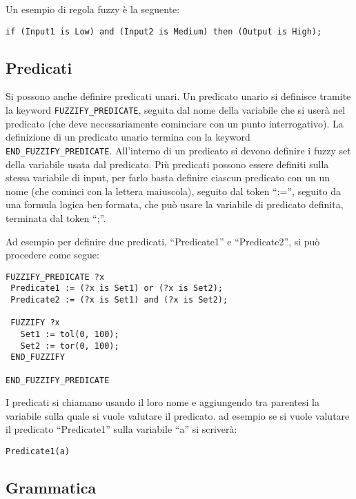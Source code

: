 Un esempio di regola fuzzy è la seguente:

\begin{verbatim}
if (Input1 is Low) and (Input2 is Medium) then (Output is High); 
\end{verbatim}



\subsection{Predicati}
Si possono anche definire predicati unari. Un predicato unario si definisce tramite la keyword \verb|FUZZIFY_PREDICATE|, seguita dal nome della variabile che si userà nel predicato (che deve necessariamente cominciare con un punto interrogativo). La definizione di un predicato unario termina con la keyword \verb|END_FUZZIFY_PREDICATE|. All'interno di un predicato si devono definire i fuzzy set della variabile usata dal predicato. Più predicati possono essere definiti sulla stessa variabile di input, per farlo basta definire ciascun predicato con un un nome (che cominci con la lettera maiuscola), seguito dal token ``:='', seguito da una formula logica ben formata, che può usare la variabile di predicato definita, terminata dal token ``;''.

Ad esempio per definire due predicati, ``Predicate1'' e ``Predicate2'', si può procedere come segue:
\begin{verbatim}
FUZZIFY_PREDICATE ?x
 Predicate1 := (?x is Set1) or (?x is Set2);
 Predicate2 := (?x is Set1) and (?x is Set2);
 
 FUZZIFY ?x
   Set1 := tol(0, 100);
   Set2 := tor(0, 100);
 END_FUZZIFY

END_FUZZIFY_PREDICATE
\end{verbatim}

I predicati si chiamano usando il loro nome e aggiungendo tra parentesi la variabile sulla quale si vuole valutare il predicato. ad esempio se si vuole valutare il predicato ``Predicate1'' sulla variabile ``a'' si scriverà:
\begin{verbatim}
Predicate1(a)
\end{verbatim}

\subsection{Grammatica}

